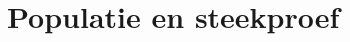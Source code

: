 \documentclass[12pt]{report}
\begin{document}
\setcounter{chapter}{10}
\chapter{Populatie en steekproef}

% 
% 
% 
\end{document}
